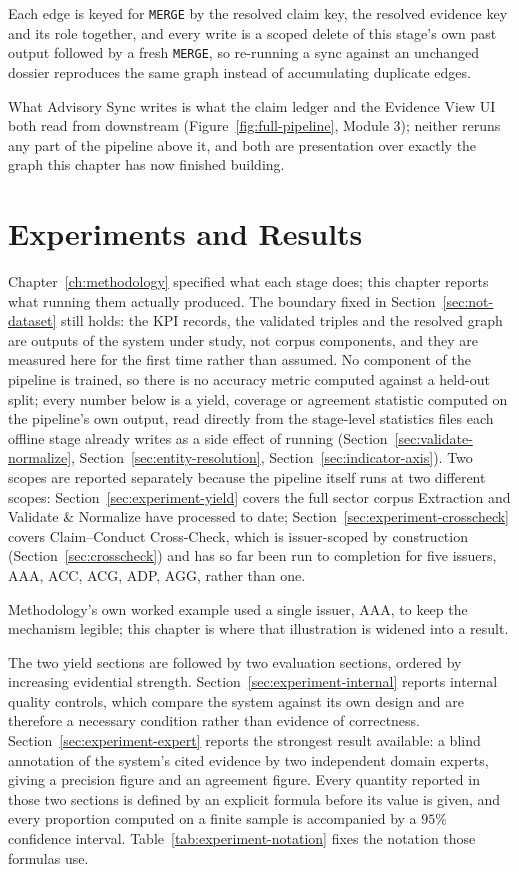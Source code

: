 \documentclass[fontsize=12pt,oneside,headings=small]{scrreprt}
\begin{document}
Each edge is keyed for \texttt{MERGE} by the resolved claim key, the resolved evidence key and its role together, and every write is a scoped delete of this stage's own past output followed by a fresh \texttt{MERGE}, so re-running a sync against an unchanged dossier reproduces the same graph instead of accumulating duplicate edges.

What Advisory Sync writes is what the claim ledger and the Evidence View UI both read from downstream (Figure~\ref{fig:full-pipeline}, Module 3); neither reruns any part of the pipeline above it, and both are presentation over exactly the graph this chapter has now finished building.

\chapter{Experiments and Results}
\label{ch:experiment}

Chapter~\ref{ch:methodology} specified what each stage does; this chapter reports what running them actually produced. The boundary fixed in Section~\ref{sec:not-dataset} still holds: the KPI records, the validated triples and the resolved graph are outputs of the system under study, not corpus components, and they are measured here for the first time rather than assumed. No component of the pipeline is trained, so there is no accuracy metric computed against a held-out split; every number below is a yield, coverage or agreement statistic computed on the pipeline's own output, read directly from the stage-level statistics files each offline stage already writes as a side effect of running (Section~\ref{sec:validate-normalize}, Section~\ref{sec:entity-resolution}, Section~\ref{sec:indicator-axis}). Two scopes are reported separately because the pipeline itself runs at two different scopes: Section~\ref{sec:experiment-yield} covers the full sector corpus Extraction and Validate \& Normalize have processed to date; Section~\ref{sec:experiment-crosscheck} covers Claim--Conduct Cross-Check, which is issuer-scoped by construction (Section~\ref{sec:crosscheck}) and has so far been run to completion for five issuers, AAA, ACC, ACG, ADP, AGG, rather than one.

Methodology's own worked example used a single issuer, AAA, to keep the mechanism legible; this chapter is where that illustration is widened into a result.

The two yield sections are followed by two evaluation sections, ordered by increasing evidential strength. Section~\ref{sec:experiment-internal} reports internal quality controls, which compare the system against its own design and are therefore a necessary condition rather than evidence of correctness. Section~\ref{sec:experiment-expert} reports the strongest result available: a blind annotation of the system's cited evidence by two independent domain experts, giving a precision figure and an agreement figure. Every quantity reported in those two sections is defined by an explicit formula before its value is given, and every proportion computed on a finite sample is accompanied by a $95\%$ confidence interval. Table~\ref{tab:experiment-notation} fixes the notation those formulas use.
\end{document}
